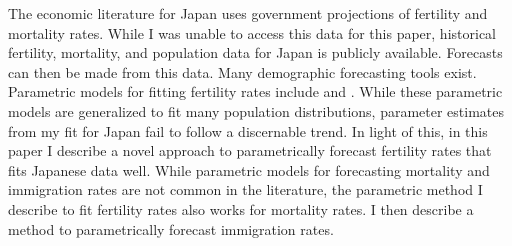 \documentclass[10pt]{article}
\numberwithin{equation}{subsection}
\begin{document}




\par The economic literature for Japan uses government projections of fertility and mortality rates. While I was unable to access this data for this paper, historical fertility, mortality, and population data for Japan is publicly available. Forecasts can then be made from this data. Many demographic forecasting tools exist. Parametric models for fitting fertility rates include \cite{HDFSB2019} and \cite{MS2011}. While these parametric models are generalized to fit many population distributions, parameter estimates from my fit for Japan fail to follow a discernable trend. In light of this, in this paper I describe a novel approach to parametrically forecast fertility rates that fits Japanese data well. While parametric models for forecasting mortality and immigration rates are not common in the literature, the parametric method I describe to fit fertility rates also works for mortality rates. I then describe a method to parametrically forecast immigration rates.
\end{document}
